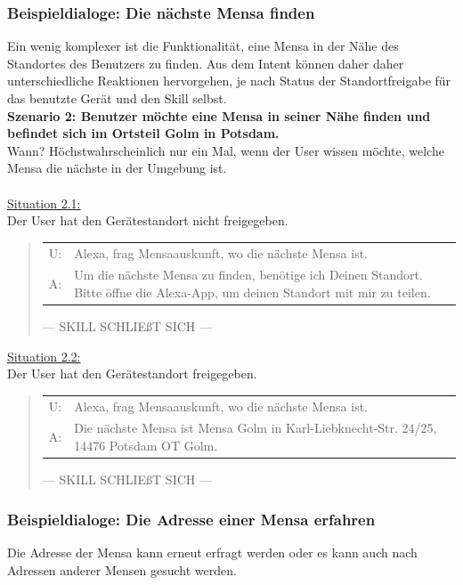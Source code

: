 \documentclass[12pt]{article}
\begin{document}
\subsubsection{Beispieldialoge: Die nächste Mensa finden}
Ein wenig komplexer ist die Funktionalität, eine Mensa in der Nähe des Standortes des Benutzers zu finden.
Aus dem Intent können daher daher unterschiedliche Reaktionen hervorgehen, je nach Status der Standortfreigabe für das benutzte Gerät und den Skill selbst.\\

\textbf{Szenario 2: Benutzer möchte eine Mensa in seiner Nähe finden und befindet sich im Ortsteil Golm in Potsdam.}\\
Wann? Höchstwahrscheinlich nur ein Mal, wenn der User wissen möchte, welche Mensa die nächste in der Umgebung ist.\\~\\
\ul{Situation 2.1:}\\Der User hat den Gerätestandort nicht freigegeben.
\begin{quote}
\begin{tabular}{lp{12cm}}
	U:& Alexa, frag Mensaauskunft, wo die nächste Mensa ist.\\
	A:& Um die nächste Mensa zu finden, benötige ich Deinen Standort. Bitte öffne die Alexa-App, um deinen Standort mit mir zu teilen.\\[0.2cm]
\end{tabular}
--- SKILL SCHLIEßT SICH ---\\
\end{quote}

\ul{Situation 2.2:}\\Der User hat den Gerätestandort freigegeben.
\begin{quote}
\begin{tabular}{lp{12cm}}
	U:& Alexa, frag Mensaauskunft, wo die nächste Mensa ist.\\
	A:& Die nächste Mensa ist Mensa Golm in Karl-Liebknecht-Str. 24/25, 14476 Potsdam OT Golm.\\[0.2cm]
\end{tabular}
--- SKILL SCHLIEßT SICH ---\\
\end{quote}

\subsubsection{Beispieldialoge: Die Adresse einer Mensa erfahren}
Die Adresse der Mensa kann erneut erfragt werden oder es kann auch nach Adressen anderer Mensen gesucht werden.\\
\end{document}
